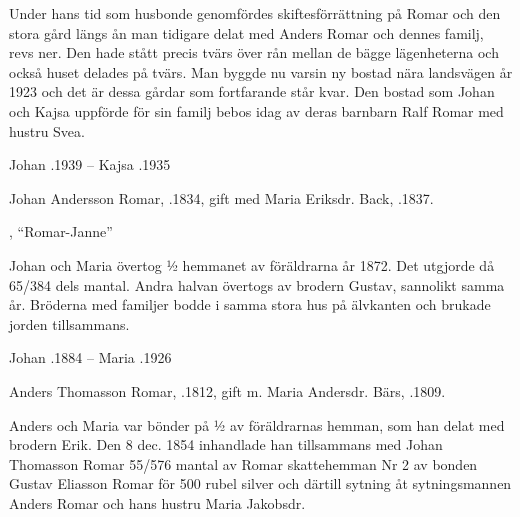 Under hans tid som husbonde genomfördes skiftesförrättning på Romar och den stora gård längs ån man tidigare delat med Anders Romar och dennes familj, revs ner. Den hade stått precis tvärs över rån mellan de bägge lägenheterna och också huset delades på tvärs. Man byggde nu varsin ny bostad nära landsvägen år 1923 och det är dessa gårdar som fortfarande står kvar. Den bostad som Johan och Kajsa uppförde för sin familj bebos idag av deras barnbarn Ralf Romar med hustru Svea.

Johan .1939  --  Kajsa .1935



Johan Andersson Romar, .1834, gift med Maria Eriksdr. Back, .1837.
\begin{jhchildren}
  \item {}
  \item {}, ``Romar-Janne''
  \item {}
\end{jhchildren}
Johan och Maria övertog ½ hemmanet av föräldrarna år 1872. Det utgjorde då 65/384 dels mantal. Andra halvan övertogs av brodern Gustav, sannolikt samma år. Bröderna med familjer bodde i samma stora hus på älvkanten och brukade jorden tillsammans.

Johan .1884  --  Maria .1926


Anders Thomasson Romar, .1812, gift m. Maria Andersdr. Bärs, .1809.
\begin{jhchildren}
  \item {}
  \item {}
  \item {}
  \item {}
  \item {}
  \item {}
  \item {}
  \item {}
\end{jhchildren}
Anders och Maria var bönder på ½ av föräldrarnas hemman, som han delat med brodern Erik. Den 8 dec. 1854 inhandlade han tillsammans med Johan Thomasson Romar 55/576 mantal av Romar skattehemman Nr 2 av bonden Gustav Eliasson Romar för 500 rubel silver och därtill sytning åt sytningsmannen Anders Romar och hans hustru Maria Jakobsdr.

